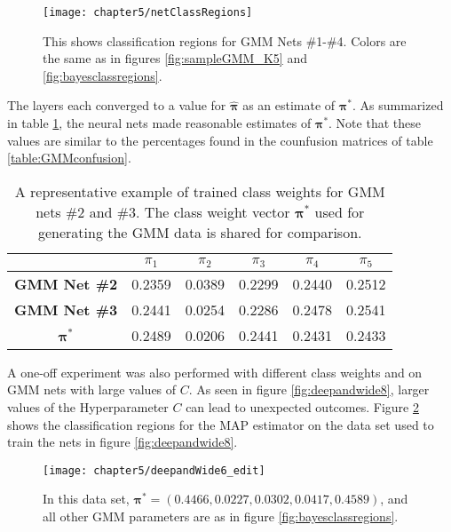 \begin{figure}[ht]
	\centering
	\texttt{[image: chapter5/netClassRegions]}
	\caption[Classification Regions for GMM nets \#1-\#4]{This shows classification regions for GMM Nets \#1-\#4. Colors are the same as in figures \ref{fig:sampleGMM_K5} and \ref{fig:bayesclassregions}. }
	\label{fig:netclassregions}
\end{figure}

\FloatBarrier


The \RS layers each converged to a value for \( \hat{\bm \pi} \) as an estimate of \( \bm\pi^{\ast}.\) As summarized in table \ref{table:GMMClassWeights}, the neural nets made reasonable estimates of \( \bm\pi^{\ast} \). Note that these values are similar to the percentages found in the counfusion matrices of table \ref{table:GMMconfusion}.

\begin{table}[ht]
	\centering
	\renewcommand{\arraystretch}{1.2}
	\begin{tabular}{c|c|c|c|c|c|}
		\cline{2-6}
		& \(\pi_1\) & \(\pi_2\) & \(\pi_3\) & \(\pi_4\) & \(\pi_5\) \\ \hline
		\multicolumn{1}{|c|}{\textbf{GMM Net \#2}} & 0.2359    & 0.0389    & 0.2299    & 0.2440    & 0.2512    \\ \hline
		\multicolumn{1}{|c|}{\textbf{GMM Net \#3}} & 0.2441    & 0.0254    & 0.2286    & 0.2478    & 0.2541    \\ \hline
		\multicolumn{1}{|c|}{\(\bm\pi^{\ast}\)}    & 0.2489    & 0.0206    & 0.2441    & 0.2431    & 0.2433    \\ \hline
	\end{tabular}
	\caption[MLE of Class weights for GMM nets \#2 and \#3]{A representative example of trained class weights for GMM nets \#2 and \#3. The class weight vector \( \bm\pi^{\ast} \) used for generating the GMM data is shared for comparison.}\label{table:GMMClassWeights}
\end{table}

A one-off experiment was also performed with different class weights and on GMM nets with large values of \( C \). As seen in figure \ref{fig:deepandwide8}, larger values of the Hyperparameter \( C \) can lead to unexpected outcomes. Figure \ref{fig:deepandwide6mapclassregions} shows the classification regions for the MAP estimator on the data set used to train the nets in figure \ref{fig:deepandwide8}.

\begin{figure}[ht]
	\centering
	\texttt{[image: chapter5/deepandWide6\_edit]}
	\caption[Classification regions for MAP estimator 2]{In this data set, \( \bm\pi^{\ast} = ( 0.4466,    0.0227,    0.0302,    0.0417,    0.4589) \), and all other GMM parameters are as in figure \ref{fig:bayesclassregions}. }
	\label{fig:deepandwide6mapclassregions}
\end{figure}

